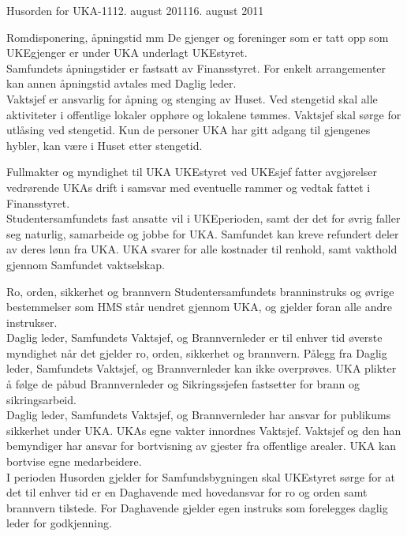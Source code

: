 \begin{instruks}{Husorden for UKA-11}{12. august 2011}{16. august 2011}
\begin{instruksledd}{Romdisponering, åpningstid mm}
De gjenger og foreninger som er tatt opp som UKEgjenger er under UKA
underlagt UKEstyret.\\

Samfundets åpningstider er fastsatt av Finansstyret. For enkelt arrangementer
kan annen åpningstid avtales med Daglig leder.\\

Vaktsjef er ansvarlig for åpning og stenging av Huset. Ved stengetid skal alle
aktiviteter i offentlige lokaler opphøre og lokalene tømmes. Vaktsjef skal sørge
for utlåsing ved stengetid. Kun de personer UKA har gitt adgang til gjengenes
hybler, kan være i Huset etter stengetid.
\end{instruksledd}

\begin{instruksledd}{Fullmakter og myndighet til UKA}
UKEstyret ved UKEsjef fatter avgjørelser vedrørende UKAs drift i samsvar med
eventuelle rammer og vedtak fattet i Finansstyret.\\

Studentersamfundets fast ansatte vil i UKEperioden, samt der det for øvrig faller
seg naturlig, samarbeide og jobbe for UKA. Samfundet kan kreve refundert deler
av deres lønn fra UKA. UKA svarer for alle kostnader til renhold, samt vakthold
gjennom Samfundet vaktselskap.
\end{instruksledd}

\begin{instruksledd}{Ro, orden, sikkerhet og brannvern}
Studentersamfundets branninstruks og øvrige bestemmelser som HMS står
uendret gjennom UKA, og gjelder foran alle andre instrukser.\\

Daglig leder, Samfundets Vaktsjef, og Brannvernleder er til enhver tid øverste
myndighet når det gjelder ro, orden, sikkerhet og brannvern. Pålegg fra Daglig
leder, Samfundets Vaktsjef, og Brannvernleder kan ikke overprøves. UKA plikter
å følge de påbud Brannvernleder og Sikringssjefen fastsetter for brann og
sikringsarbeid.\\

Daglig leder, Samfundets Vaktsjef, og Brannvernleder har ansvar for publikums
sikkerhet under UKA. UKAs egne vakter innordnes Vaktsjef. Vaktsjef og den han
bemyndiger har ansvar for bortvisning av gjester fra offentlige arealer. UKA kan
bortvise egne medarbeidere.\\

I perioden Husorden gjelder for Samfundsbygningen skal UKEstyret sørge for at
det til enhver tid er en Daghavende med hovedansvar for ro og orden samt
brannvern tilstede. For Daghavende gjelder egen instruks som forelegges daglig
leder for godkjenning.\\


\end{instruksledd}
\end{instruks}
